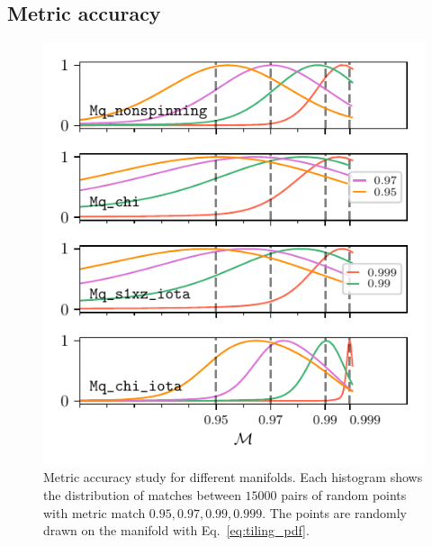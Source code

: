 \documentclass[twocolumn,showpacs,preprintnumbers,nofootinbib,prd,
superscriptaddress,10pt]{revtex4-2}
\begin{document}
\subsection{Metric accuracy} \label{sec:metric_accuracy}

\begin{figure}[t]
	\centering
	\includegraphics{metric_accuracy_hessian}
	\caption{Metric accuracy study for different manifolds.
	Each histogram shows the distribution of matches between $15000$ pairs of random points with metric match $0.95, 0.97, 0.99, 0.999$. The points are randomly drawn on the manifold with Eq.~\eqref{eq:tiling_pdf}.}
	\label{fig:metric_accuracy}
\end{figure}
\end{document}
